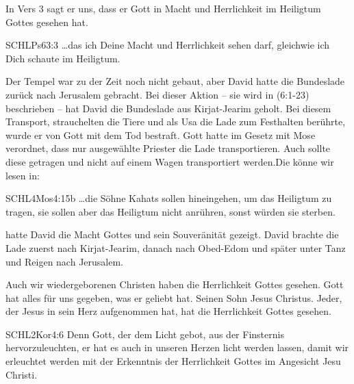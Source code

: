 \documentclass[14pt]{../../inc/mybib}
\begin{document}
    \begin{block}
        In Vers 3 sagt er uns, dass er Gott in Macht und Herrlichkeit im Heiligtum Gottes gesehen hat.
        \begin{bibelbox}{SCHL}{Ps}{63:3}
            \dots das ich Deine Macht und Herrlichkeit sehen darf, gleichwie ich Dich schaute im Heiligtum.
        \end{bibelbox}
        Der Tempel war zu der Zeit noch nicht gebaut, aber David hatte die Bundeslade zurück nach Jerusalem gebracht. Bei dieser Aktion -- sie wird in  (6:1-23) beschrieben -- hat David die Bundeslade aus Kirjat-Jearim geholt. Bei diesem Transport, strauchelten die Tiere und als Usa die Lade zum Festhalten berührte, wurde er von Gott mit dem Tod bestraft. Gott hatte im Gesetz mit Mose verordnet, dass nur ausgewählte Priester die Lade transportieren. Auch sollte diese getragen und nicht auf einem Wagen transportiert werden.Die könne wir lesen in:
        \begin{bibelbox}{SCHL}{4Mos}{4:15b}
            \dots die Söhne Kahats sollen hineingehen, um das Heiligtum zu tragen, sie sollen aber das Heiligtum nicht anrühren, sonst würden sie sterben.
        \end{bibelbox}
         hatte David die Macht Gottes und sein Souveränität gezeigt. David brachte die Lade zuerst nach Kirjat-Jearim, danach nach Obed-Edom und später unter Tanz und Reigen nach Jerusalem.
    \end{block}

    \begin{block}
        Auch wir wiedergeborenen Christen haben die Herrlichkeit Gottes gesehen. Gott hat alles für uns gegeben, was er geliebt hat. Seinen Sohn Jesus Christus. Jeder, der Jesus in sein Herz aufgenommen hat, hat die Herrlichkeit Gottes gesehen.
        \begin{bibelbox}{SCHL}{2Kor}{4:6}
            Denn Gott, der dem Licht gebot, aus der Finsternis hervorzuleuchten, er hat es auch in unseren Herzen licht werden lassen, damit wir erleuchtet werden mit der Erkenntnis der Herrlichkeit Gottes im Angesicht Jesu Christi.
        \end{bibelbox}
    \end{block}
\end{document}
